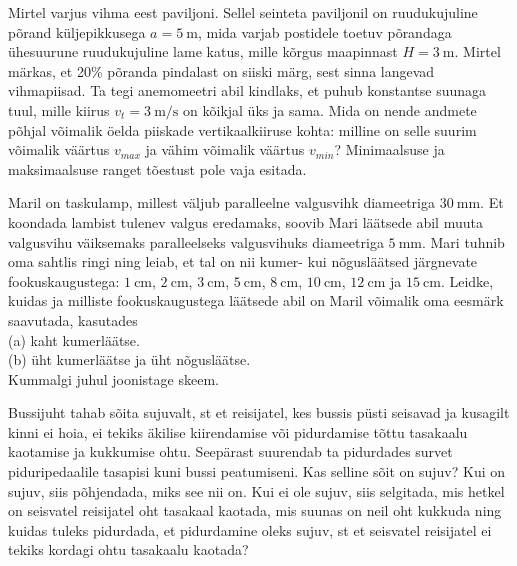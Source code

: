 \documentclass[10pt]{article}
\begin{document}
Mirtel varjus vihma eest paviljoni. Sellel seinteta paviljonil on ruudukujuline põrand küljepikkusega $a = \SI{5}{\meter}$, mida varjab postidele toetuv põrandaga ühesuurune ruudukujuline lame katus, mille kõrgus maapinnast $H=\SI{3}{\meter}$. Mirtel märkas, et 20\% põranda pindalast on siiski märg, sest sinna langevad vihmapiisad. Ta tegi anemomeetri abil kindlaks, et puhub konstantse suunaga tuul, mille kiirus $v_t = \SI{3}{\meter\per\second}$ on kõikjal üks ja sama. Mida on nende andmete põhjal võimalik öelda piiskade vertikaalkiiruse kohta: milline on selle suurim võimalik väärtus $v_{max}$ ja vähim võimalik väärtus $v_{min}$?
Minimaalsuse ja maksimaalsuse ranget tõestust pole vaja esitada.
\probend
\bigskip


Maril on taskulamp, millest väljub paralleelne valgusvihk diameetriga $\SI{30}{\mm}$. Et koondada lambist tulenev valgus eredamaks, soovib Mari läätsede abil muuta valgusvihu väiksemaks paralleelseks valgusvihuks diameetriga $\SI{5}{\mm}$. Mari tuhnib oma sahtlis ringi ning leiab, et tal on nii kumer- kui nõgusläätsed järgnevate fookuskaugustega: $\SI{1}{\cm}$, $\SI{2}{\cm}$, $\SI{3}{\cm}$, $\SI{5}{\cm}$, $\SI{8}{\cm}$, $\SI{10}{\cm}$, $\SI{12}{\cm}$ ja $\SI{15}{\cm}$. Leidke, kuidas ja milliste fookuskaugustega läätsede abil on Maril võimalik oma eesmärk saavutada, kasutades
\\ (a) kaht kumerläätse.
\\ (b) üht kumerläätse ja üht nõgusläätse.
\\ Kummalgi juhul joonistage skeem.
\probend
\bigskip


Bussijuht tahab sõita sujuvalt, st et reisijatel, kes bussis püsti seisavad ja kusagilt kinni ei hoia, ei tekiks äkilise kiirendamise või pidurdamise tõttu tasakaalu kaotamise ja kukkumise ohtu. Seepärast suurendab ta pidurdades survet piduripedaalile tasapisi kuni bussi peatumiseni. Kas selline sõit on sujuv? Kui on sujuv, siis põhjendada, miks see nii on. Kui ei ole sujuv, siis selgitada, mis hetkel on seisvatel reisijatel oht tasakaal kaotada, mis suunas on neil oht kukkuda ning kuidas tuleks pidurdada, et pidurdamine oleks sujuv, st et seisvatel reisijatel ei tekiks kordagi ohtu tasakaalu kaotada?
\probend
\bigskip
\end{document}
